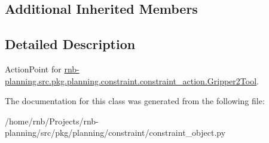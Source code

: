 \subsection*{Additional Inherited Members}


\subsection{Detailed Description}
Action\+Point for \hyperlink{classrnb-planning_1_1src_1_1pkg_1_1planning_1_1constraint_1_1constraint__action_1_1_gripper2_tool}{rnb-\/planning.\+src.\+pkg.\+planning.\+constraint.\+constraint\+\_\+action.\+Gripper2\+Tool}. 

The documentation for this class was generated from the following file\+:\begin{DoxyCompactItemize}
\item 
/home/rnb/\+Projects/rnb-\/planning/src/pkg/planning/constraint/constraint\+\_\+object.\+py\end{DoxyCompactItemize}
